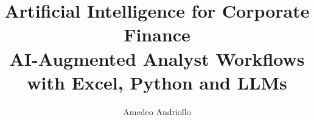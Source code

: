 
\livefalse
\title[AI Corporate Finance | S1]{Artificial Intelligence for Corporate Finance\\[2pt]\large AI-Augmented Analyst Workflows with Excel, Python and LLMs}
\author[Amedeo Andriollo]{Amedeo Andriollo}

\begin{frame}\titlepage\end{frame}


